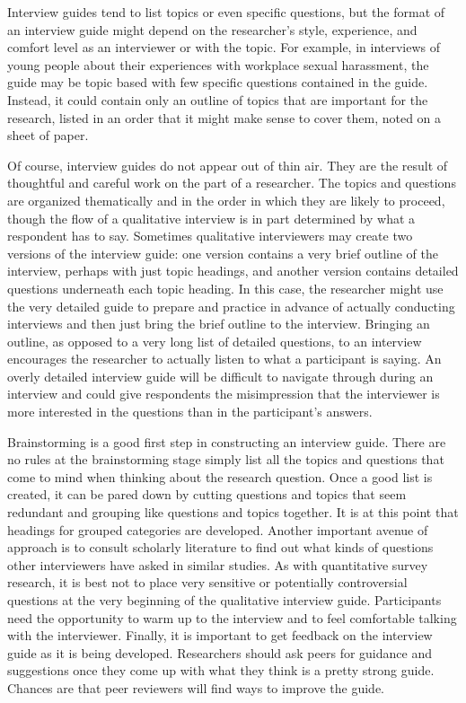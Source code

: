 Interview guides tend to list topics or even specific questions, but the format of an interview guide might depend on the researcher's style, experience, and comfort level as an interviewer or with the topic. For example, in interviews of young people about their experiences with workplace sexual harassment, the guide may be topic based with few specific questions contained in the guide. Instead, it could contain only an outline of topics that are important for the research, listed in an order that it might make sense to cover them, noted on a sheet of paper.

Of course, interview guides do not appear out of thin air. They are the result of thoughtful and careful work on the part of a researcher. The topics and questions are organized thematically and in the order in which they are likely to proceed, though the flow of a qualitative interview is in part determined by what a respondent has to say. Sometimes qualitative interviewers may create two versions of the interview guide: one version contains a very brief outline of the interview, perhaps with just topic headings, and another version contains detailed questions underneath each topic heading. In this case, the researcher might use the very detailed guide to prepare and practice in advance of actually conducting interviews and then just bring the brief outline to the interview. Bringing an outline, as opposed to a very long list of detailed questions, to an interview encourages the researcher to actually listen to what a participant is saying. An overly detailed interview guide will be difficult to navigate through during an interview and could give respondents the misimpression that the interviewer is more interested in the questions than in the participant's answers.

Brainstorming is a good first step in constructing an interview guide. There are no rules at the brainstorming stage \emdash simply list all the topics and questions that come to mind when thinking about the research question. Once a good list is created, it can be pared down by cutting questions and topics that seem redundant and grouping like questions and topics together. It is at this point that headings for grouped categories are developed. Another important avenue of approach is to consult scholarly literature to find out what kinds of questions other interviewers have asked in similar studies. As with quantitative survey research, it is best not to place very sensitive or potentially controversial questions at the very beginning of the qualitative interview guide. Participants need the opportunity to warm up to the interview and to feel comfortable talking with the interviewer. Finally, it is important to get feedback on the interview guide as it is being developed. Researchers should ask peers for guidance and suggestions once they come up with what they think is a pretty strong guide. Chances are that peer reviewers will find ways to improve the guide.

